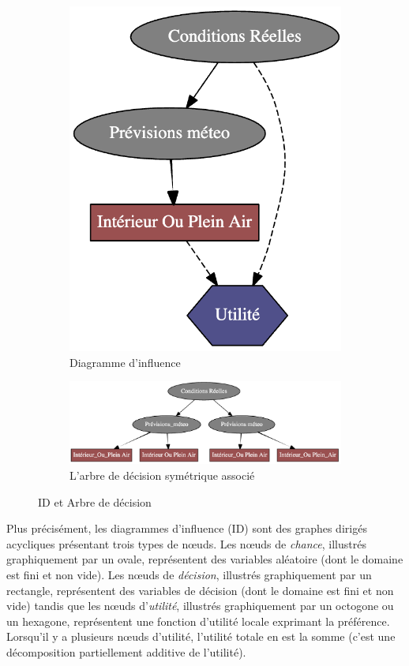 \documentclass[12pt]{article}
\begin{document}
\begin{figure}[ht]
\centering
\begin{subfigure}{.5\textwidth}
  \centering
  \includegraphics[width=.5\linewidth]{docs/ressources_rapport/exempleID_SIMPLE.png}
  \caption{Diagramme d'influence}
  \label{fig:sub1}
\end{subfigure}%
\begin{subfigure}{.5\textwidth}
  \centering
  \includegraphics[width=1.2\linewidth]{docs/ressources_rapport/exempleArbreDecision.png}
  \caption{L'arbre de décision symétrique associé}
  \label{fig:sub2}
\end{subfigure}
\caption{ID et Arbre de décision}
\label{fig:test}
\end{figure}

Plus précisément, les diagrammes d'influence (ID) sont des graphes dirigés acycliques présentant trois types de nœuds. Les nœuds de \textit{chance}, illustrés graphiquement par un ovale, représentent des variables aléatoire (dont le domaine est fini et non vide). 
Les nœuds de \textit{décision}, illustrés graphiquement par un rectangle, représentent des variables de décision (dont le domaine est fini et non vide) tandis que les nœuds d'\textit{utilité}, illustrés graphiquement par un octogone ou un hexagone, représentent une fonction d'utilité locale exprimant la préférence.
Lorsqu'il y a plusieurs nœuds d'utilité, l'utilité totale en est la somme (c'est une décomposition partiellement additive de l'utilité).
\end{document}
